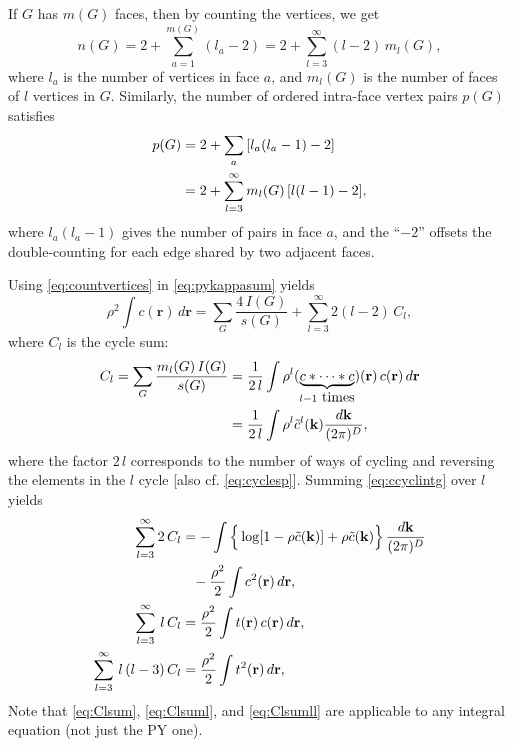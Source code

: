 \documentclass[notitlepage,preprint]{revtex4-1}
\newcommand{\vct}[1]{\mathbf{#1}}
\providecommand{\vr}{} %
\renewcommand{\vr}{\vct{r}}
\newcommand{\vk}{\vct{k}}
\newcommand{\dvk}{\frac{d\vk}{(2\pi)^D}}
\begin{document}
If $G$ has $m(G)$ faces, then by counting the vertices, we get
%
\begin{equation}
  n(G) = 2 + \sum_{a = 1}^{m(G)} (l_a - 2)
       = 2 + \sum_{l = 3}^\infty (l - 2) \, m_l(G),
\label{eq:countvertices}
\end{equation}
%
where
  $l_a$ is the number of vertices in face $a$,
%
and
  $m_l(G)$ is the number of faces of $l$ vertices in $G$.
%
Similarly, the number of ordered intra-face vertex pairs
  $p(G)$ satisfies
%
\begin{align}
  p(G)  &= 2 + \sum_{a} \left[ l_a (l_a - 1) - 2 \right]
                        \notag \\
        &= 2 + \sum_{l = 3}^\infty m_l(G) \, [l(l-1) - 2],
\label{eq:countpairs}
\end{align}
%
where $l_a (l_a - 1)$ gives the number of pairs in face $a$,
  and the ``$-2$'' %
  offsets the double-counting
  for each edge shared by two adjacent faces.






Using \eqref{eq:countvertices} in \eqref{eq:pykappasum} yields
%
\begin{equation}
    \rho^2 \int c(\vr) \, d\vr
  = \sum_G \frac{ 4 \, I(G) }{ s(G) }
  + \sum_{l = 3}^\infty 2 (l - 2) \, C_l,
\label{eq:pyintgcr2sums}
\end{equation}
%
where $C_l$ is the cycle sum:
%
\begin{align}
      C_l
  =  \sum_G \frac{ m_l(G) \, I(G) } { s(G) }
  &=  \frac{1}{2 \, l}
      \int \rho^l (\underbrace{c*\cdots *c}_{l-1 \mbox{ times}})(\vr)
                        \, c(\vr) \, d\vr
      \notag \\
  &=  \frac{1}{2 \, l}
      \int \rho^l \tilde{c}^l(\vk) \dvk,
\label{eq:ccyclintg}
\end{align}
%
where the factor $2 \, l$ corresponds to the number of ways
  of cycling and reversing the elements in the $l$ cycle
  [also cf. \eqref{eq:cyclesp}].
%
Summing \eqref{eq:ccyclintg} over $l$ yields
%
\begin{align}
     \sum_{l=3}^{\infty} 2 \, C_l
  &= -\int \Big\{
              \log[ 1 - \rho \tilde{c}(\vk) ]
            + \rho \tilde{c}(\vk)
           \Big\}\, \dvk \notag \\
  & \hphantom{=}
     - \frac{\rho^2}{2} \int c^2(\vr) \, d\vr,
     \label{eq:Clsum} \\
      \sum_{l=3}^{\infty} \, l \, C_l
  &=
      \frac{ \rho^2 }{2} \int t(\vr) \, c(\vr) \, d\vr,
      \label{eq:Clsuml} \\
      \sum_{l=3}^{\infty} \, l \, (l - 3) \, C_l
  &=  \frac{ \rho^2 }{ 2 }
      \int t^2(\vr) \, d\vr,
\label{eq:Clsumll}
\end{align}
%
Note that \eqref{eq:Clsum}, \eqref{eq:Clsuml}, and \eqref{eq:Clsumll}
  are applicable to any integral equation (not just the PY one).
\end{document}
